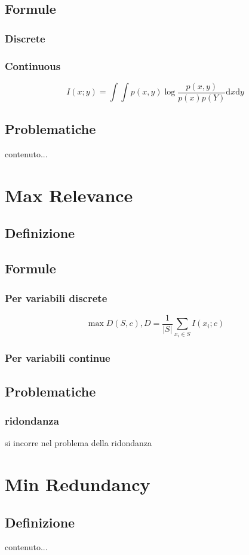 \documentclass{beamer}
\begin{document}
\subsection{Formule}
\begin{frame}
	\frametitle{Discrete}
\end{frame}
\begin{frame}
	\frametitle{Continuous}
	$$ I (x;y) = \int \int p(x,y)\log \frac{p(x,y)}{p(x)p(Y)} \mathrm{d}x \mathrm{d}y$$
\end{frame}
\subsection{Problematiche}
\begin{frame}
	contenuto...
\end{frame}

\section{Max Relevance}
\subsection{Definizione}
\subsection{Formule}
\begin{frame}
	\frametitle{Per variabili discrete}
	$$\max D(S,c), D= \frac{1}{|S|} \sum\limits_{x_i \in S} I (x_i;c)$$
\end{frame}
\begin{frame}
	\frametitle{Per variabili continue}
\end{frame}
\subsection{Problematiche}
\begin{frame}
	\frametitle{ridondanza}
	si incorre nel problema della ridondanza
\end{frame}

\section{Min Redundancy}
\subsection{Definizione}
\begin{frame}
	contenuto...
\end{frame}
\end{document}
